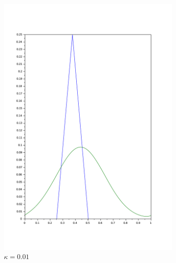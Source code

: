 \documentclass{article}
\begin{document}
\begin{figure}
	\centering
	\begin{subfigure}[b]{0.3\textwidth}
		\includegraphics[width=\textwidth]{conv_kappa_0,01.pdf}
		\caption{$\kappa=0.01$}
	\end{subfigure}
	\quad
	\begin{subfigure}[b]{0.3\textwidth}

\end{subfigure}
\end{figure}
\end{document}
